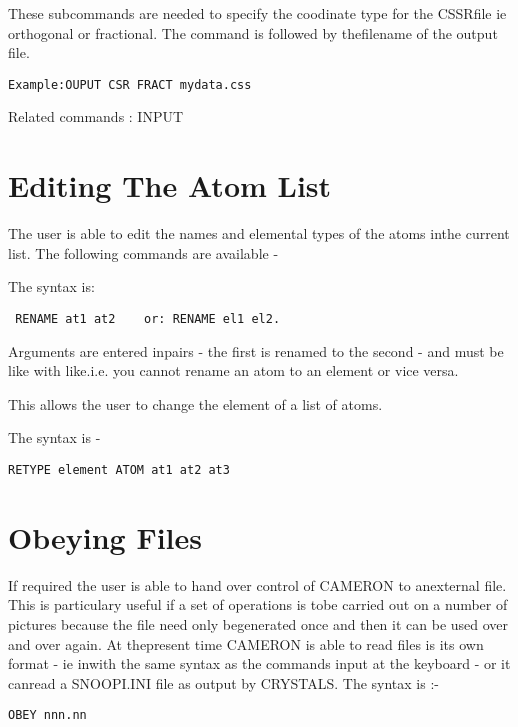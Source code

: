 \documentclass[10pt,a4paper]{report}
\begin{document}
\bigskip{}

\bigskip{}These subcommands are needed to specify the coodinate type for the CSSRfile ie orthogonal or fractional. The command is followed by thefilename of the output file.\small\begin{verbatim}Example:OUPUT CSR FRACT mydata.css\end{verbatim}\normalsize



Related commands : INPUT\chapter{Editing The Atom List}

The user is able to edit the names and elemental types of the atoms inthe current list. The following commands are available -

\bigskip{}

The syntax is:\small\begin{verbatim} RENAME at1 at2    or: RENAME el1 el2.\end{verbatim}\normalsize



Arguments are entered inpairs - the first is renamed to the second - and must be like with like.i.e. you cannot rename an atom to an element or vice versa.

\bigskip{}

This allows the user to change the element of a list of atoms.

\bigskip{}The syntax is -\small\begin{verbatim}RETYPE element ATOM at1 at2 at3\end{verbatim}\normalsize

\chapter{Obeying Files}

\bigskip{}



If required the user is able to hand over control of CAMERON to anexternal file. This is particulary useful if a set of operations is tobe carried out on a number of pictures because the file need only begenerated once and then it can be used over and over again. At thepresent time CAMERON is able to read files is its own format - ie inwith the same syntax as the commands input at the keyboard - or it canread a SNOOPI.INI file as output by CRYSTALS. The syntax is :-\small\begin{verbatim}OBEY nnn.nn\end{verbatim}\normalsize
\end{document}
